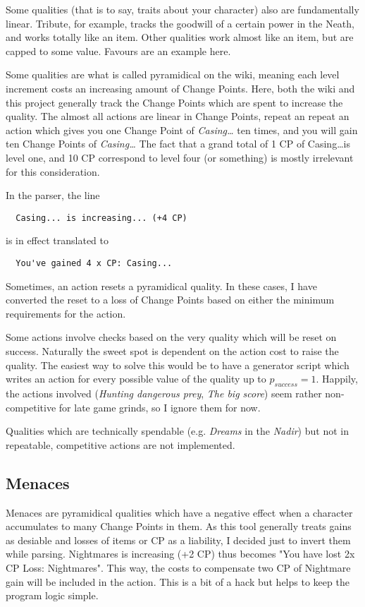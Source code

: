 \documentclass[a4paper,11pt,openright,twoside]{scrartcl}
\begin{document}
Some qualities (that is to say, traits about your character) also are fundamentally linear. Tribute, for example, tracks the goodwill of a certain power in the Neath, and works totally like an item. Other qualities work almost like an item, but are capped to some value. Favours are an example here.

Some qualities are what is called pyramidical on the wiki, meaning each level increment costs an increasing amount of Change Points. Here, both the wiki and this project generally track the Change Points which are spent to increase the quality. The almost all actions are linear in Change Points, repeat an repeat an action which gives you one Change Point of \emph{Casing\ldots} ten times, and you will gain ten Change Points of \emph{Casing\ldots} The fact that a grand total of 1 CP of Casing\ldots is level one, and 10 CP correspond to level four (or something) is mostly irrelevant for this consideration.

In the parser, the line
\begin{lstlisting}
  Casing... is increasing... (+4 CP)
\end{lstlisting}
is in effect translated to
\begin{lstlisting}
  You've gained 4 x CP: Casing...
\end{lstlisting}


Sometimes, an action resets a pyramidical quality. In these cases, I have converted the reset to a loss of Change Points based on either the minimum requirements for the action.

Some actions involve checks based on the very quality which will be reset on success. Naturally the sweet spot  is dependent on the action cost to raise the quality. The easiest way to solve this would be to have a generator script which writes an action for every possible value of the quality up to $p_{success}=1$. Happily, the actions involved (\emph{Hunting dangerous prey}, \emph{The big score}) seem rather non-competitive for late game grinds, so I ignore them for now.

Qualities which are technically spendable (e.g. \emph{Dreams} in the \emph{Nadir}) but not in repeatable, competitive actions are not implemented.

\subsection{Menaces}

Menaces are pyramidical qualities which have a negative effect when a character accumulates to many Change Points in them. As this tool generally treats gains as desiable and losses of items or CP as a liability, I decided just to invert them while parsing. Nightmares is increasing (+2 CP) thus becomes "You have lost 2x CP Loss: Nightmares". This way, the costs to compensate two CP of Nightmare gain will be included in the action. This is a bit of a hack but helps to keep the program logic simple.
\end{document}

